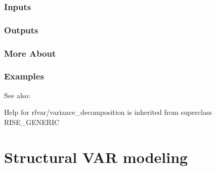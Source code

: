 \documentclass[letterpaper,10pt,english]{sphinxmanual}
\begin{document}
\subsection{Inputs}
\label{classes/models/@rfvar/rfvar:id188}

\subsection{Outputs}
\label{classes/models/@rfvar/rfvar:id189}

\subsection{More About}
\label{classes/models/@rfvar/rfvar:id190}

\subsection{Examples}
\label{classes/models/@rfvar/rfvar:id191}
See also:

Help for rfvar/variance\_decomposition is inherited from superclass RISE\_GENERIC


\chapter{Structural VAR modeling}
\label{classes/models/@svar/svar:structural-var-modeling}\label{classes/models/@svar/svar::doc}
\end{document}
